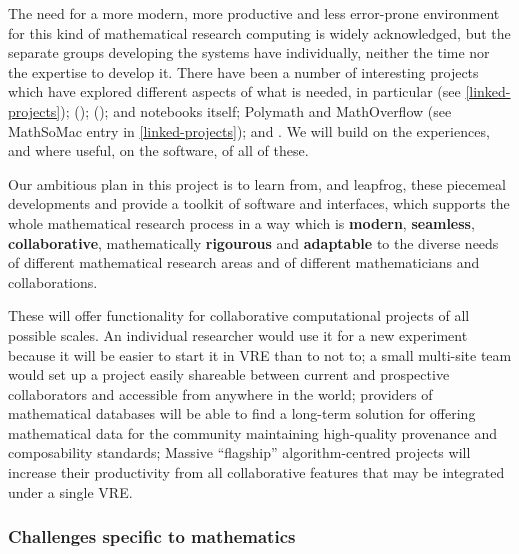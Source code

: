 The need for a more modern, more productive and less error-prone
environment for this kind of mathematical research computing is widely
acknowledged, but the separate groups developing the systems have
individually, neither the time nor the expertise to develop it. There
have been a number of interesting projects which have explored
different aspects of what is needed, in particular
\SMC (see \ref{linked-projects});
\HPCGAP ();
\scienceproject ();
\Sage and \Sage notebooks itself;
Polymath and MathOverflow (see MathSoMac entry in \ref{linked-projects});
and .
We will build on the experiences, and where useful, on the software, of all of these.

Our ambitious plan in this project is to learn from, and leapfrog,
these piecemeal developments and provide a toolkit of software and
interfaces, which supports the whole mathematical research process in
a way which is \textbf{modern}, \textbf{seamless},
\textbf{collaborative}, mathematically \textbf{rigourous} and
\textbf{adaptable} to the diverse needs of different mathematical
research areas and of different mathematicians and collaborations.


  
These will offer functionality for collaborative computational projects
of all possible scales. An individual researcher would use it for a new
experiment because it will be easier to start it in VRE than to not to;
a small multi-site team would set up a project easily shareable between
current and prospective collaborators and accessible from anywhere in the
world; providers of mathematical databases will be able to find a long-term
solution for offering mathematical data for the community maintaining
high-quality provenance and composability standards; Massive ``flagship''
algorithm-centred projects will increase their productivity from all
collaborative features that may be integrated under a single VRE.

\subsubsection{Challenges specific to  mathematics}

